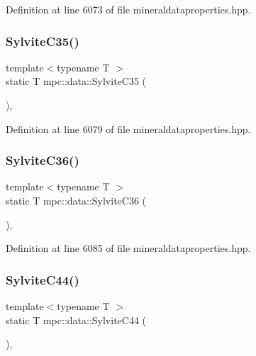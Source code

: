 Definition at line 6073 of file mineraldataproperties.\+hpp.

\mbox{\label{namespacempc_1_1data_ab2519e175678176b1cd4333711a0282e}} 
\subsubsection{\texorpdfstring{Sylvite\+C35()}{SylviteC35()}}
{\footnotesize\ttfamily template$<$typename T $>$ \\
static T mpc\+::data\+::\+Sylvite\+C35 (\begin{DoxyParamCaption}{ }\end{DoxyParamCaption})\hspace{0.3cm}{\ttfamily [inline]}, {\ttfamily [static]}}



Definition at line 6079 of file mineraldataproperties.\+hpp.

\mbox{\label{namespacempc_1_1data_ac7d0dff453d02b93774cc9655423c962}} 
\subsubsection{\texorpdfstring{Sylvite\+C36()}{SylviteC36()}}
{\footnotesize\ttfamily template$<$typename T $>$ \\
static T mpc\+::data\+::\+Sylvite\+C36 (\begin{DoxyParamCaption}{ }\end{DoxyParamCaption})\hspace{0.3cm}{\ttfamily [inline]}, {\ttfamily [static]}}



Definition at line 6085 of file mineraldataproperties.\+hpp.

\mbox{\label{namespacempc_1_1data_a24fa19baefce0ba12b6856079f9dcc2a}} 
\subsubsection{\texorpdfstring{Sylvite\+C44()}{SylviteC44()}}
{\footnotesize\ttfamily template$<$typename T $>$ \\
static T mpc\+::data\+::\+Sylvite\+C44 (\begin{DoxyParamCaption}{ }\end{DoxyParamCaption})\hspace{0.3cm}{\ttfamily [inline]}, {\ttfamily [static]}}



